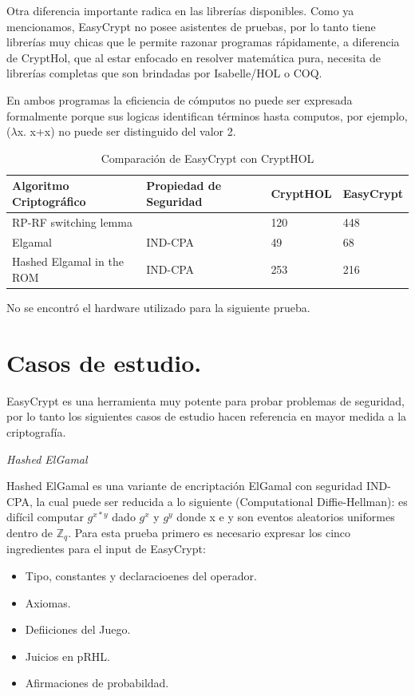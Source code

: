 \documentclass[runningheads,a4paper]{llncs}
\begin{document}
Otra diferencia importante radica en las librerías disponibles. Como ya mencionamos, EasyCrypt no posee asistentes de pruebas, por lo tanto tiene librerías muy chicas que le permite razonar programas rápidamente, a diferencia de CryptHol, que al estar enfocado en resolver matemática pura, necesita de librerías completas que son brindadas por Isabelle/HOL o COQ.

En ambos programas la eficiencia de cómputos no puede ser expresada formalmente porque sus logicas identifican términos hasta computos, por ejemplo, ($\lambda$x. x+x) no puede ser distinguido del valor 2.\cite{article6}

\begin{table}
  \caption{Comparación de EasyCrypt con CryptHOL}
  \label{tab:simple2}
  \centering
  \begin{tabular}{ |p{4cm}|p{4cm}|p{2cm}|p{2cm}|  }
 \hline
 Algoritmo Criptográfico & Propiedad de Seguridad & CryptHOL & EasyCrypt\\\cline{1-4}
 \hline
 RP-RF switching lemma &  & 120 & 448\\
 Elgamal & IND-CPA & 49  & 68\\
 Hashed Elgamal in the ROM & IND-CPA & 253 &  216\\
 \hline
\end{tabular}
\end{table}


No se encontró el hardware utilizado para la siguiente prueba.




\section{Casos de estudio.}
EasyCrypt es una herramienta muy potente para probar problemas de seguridad, por lo tanto los siguientes casos de estudio hacen referencia en mayor medida a la criptografía.


\centerline{\emph{Hashed ElGamal}}


Hashed ElGamal es una variante de encriptación ElGamal con seguridad IND-CPA, la cual puede ser reducida a lo siguiente (Computational Diffie-Hellman): es difícil computar $g^{x*y}$ dado $g^x$ y $g^y$ donde x e y son eventos aleatorios uniformes dentro de $\mathbb{Z}_q$.
Para esta prueba primero es necesario expresar los cinco ingredientes para el input de EasyCrypt:
\begin{itemize}
	\item Tipo, constantes y declaracioenes del operador.
	\item Axiomas.
	\item Defiiciones del Juego.
	\item Juicios en pRHL.
	\item Afirmaciones de probabildad.
\end{itemize}
\end{document}
